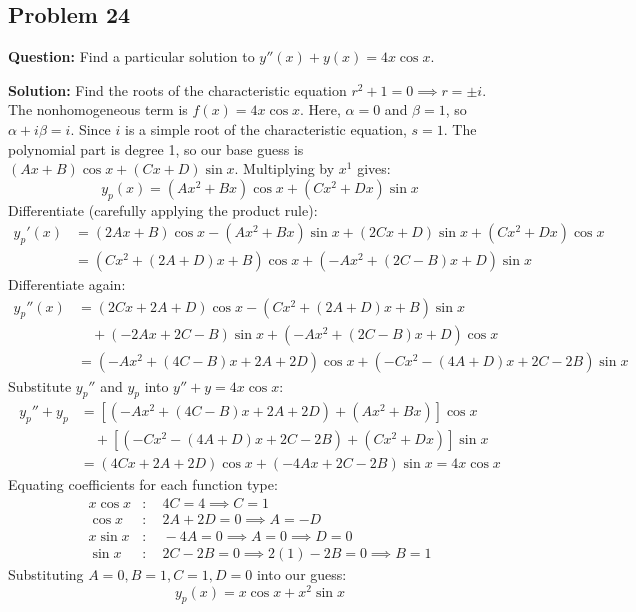 \documentclass[12pt]{article}
\begin{document}
\subsection{Problem 24}
\textbf{Question:} Find a particular solution to $y''(x) + y(x) = 4x \cos x$.

\textbf{Solution:}
Find the roots of the characteristic equation $r^2 + 1 = 0 \implies r = \pm i$.
The nonhomogeneous term is $f(x) = 4x \cos x$. Here, $\alpha = 0$ and $\beta = 1$, so $\alpha + i\beta = i$. Since $i$ is a simple root of the characteristic equation, $s = 1$.
The polynomial part is degree 1, so our base guess is $(Ax+B)\cos x + (Cx+D)\sin x$. Multiplying by $x^1$ gives:
\[ y_p(x) = (Ax^2 + Bx)\cos x + (Cx^2 + Dx)\sin x \]
Differentiate (carefully applying the product rule):
\begin{align*}
    y_p'(x) &= (2Ax + B)\cos x - (Ax^2 + Bx)\sin x + (2Cx + D)\sin x + (Cx^2 + Dx)\cos x \\
    &= (Cx^2 + (2A+D)x + B)\cos x + (-Ax^2 + (2C-B)x + D)\sin x
\end{align*}
Differentiate again:
\begin{align*}
    y_p''(x) &= (2Cx + 2A+D)\cos x - (Cx^2 + (2A+D)x + B)\sin x \\
    &\quad + (-2Ax + 2C-B)\sin x + (-Ax^2 + (2C-B)x + D)\cos x \\
    &= (-Ax^2 + (4C-B)x + 2A+2D)\cos x + (-Cx^2 - (4A+D)x + 2C-2B)\sin x
\end{align*}
Substitute $y_p''$ and $y_p$ into $y'' + y = 4x \cos x$:
\begin{align*}
    y_p'' + y_p &= \left[ (-Ax^2 + (4C-B)x + 2A+2D) + (Ax^2 + Bx) \right] \cos x \\
    &\quad + \left[ (-Cx^2 - (4A+D)x + 2C-2B) + (Cx^2 + Dx) \right] \sin x \\
    &= (4Cx + 2A+2D)\cos x + (-4Ax + 2C-2B)\sin x = 4x \cos x
\end{align*}
Equating coefficients for each function type:
\begin{align*}
    x \cos x &: \quad 4C = 4 \implies C = 1 \\
    \cos x &: \quad 2A + 2D = 0 \implies A = -D \\
    x \sin x &: \quad -4A = 0 \implies A = 0 \implies D = 0 \\
    \sin x &: \quad 2C - 2B = 0 \implies 2(1) - 2B = 0 \implies B = 1
\end{align*}
Substituting $A=0, B=1, C=1, D=0$ into our guess:
\[ y_p(x) = x \cos x + x^2 \sin x \]
\end{document}
